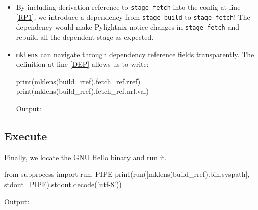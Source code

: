 \begin{itemize}
  \item By including derivation reference to \texttt{stage\_fetch} into
    the config at line \ref{RP1}, we introduce a dependency from
    \texttt{stage\_build} to \texttt{stage\_fetch}! The dependency would
    make Pylightnix notice changes in \texttt{stage\_fetch} and rebuild all
    the dependent stage as expected.

  \item \texttt{mklens} can navigate through dependency reference fields
    transparently. The definition at line \ref{DEP} allows us to write:

    \begin{pythontexcode}
    print(mklens(build_rref).fetch_ref.rref)
    print(mklens(build_rref).fetch_ref.url.val)
    \end{pythontexcode}

    Output:

    \mysmallstdout

\end{itemize}

\pagebreak
\subsection{Execute}

Finally, we locate the GNU Hello binary and run it.

\begin{pythontexcode}
from subprocess import run, PIPE
print(run([mklens(build_rref).bin.syspath], stdout=PIPE).stdout.decode('utf-8'))
\end{pythontexcode}

Output:

\mystdout


